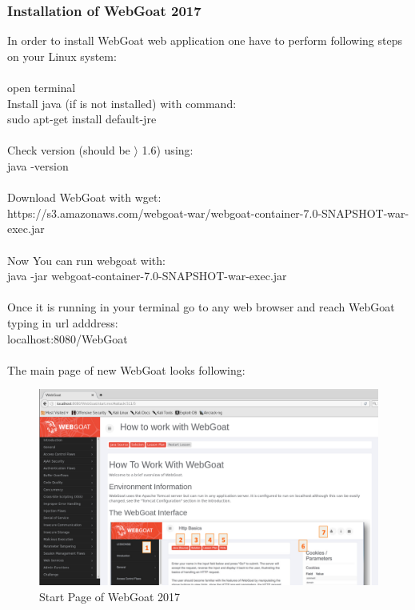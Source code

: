\documentclass[12pt, a4paper]{article}
\begin{document}
\subsubsection{Installation of WebGoat 2017}
In order to install WebGoat web application one have to perform following steps on your Linux system:\\
\\
open terminal\\
Install java (if is not installed) with command:\\
sudo apt-get install default-jre\\
\\
Check version (should be $\rangle$ 1.6) using: \\
java -version\\
\\
Download WebGoat with wget:\\
https://s3.amazonaws.com/webgoat-war/webgoat-container-7.0-SNAPSHOT-war-exec.jar\\
\\
Now You can run webgoat with:\\
java -jar webgoat-container-7.0-SNAPSHOT-war-exec.jar\\
\\
Once it is running in your terminal go to any web browser and reach WebGoat typing in url adddress:\\
localhost:8080/WebGoat\\
\\
The main page of new WebGoat looks following:\\
\begin{figure}[H]
	\includegraphics[width=1.0\textwidth]{webGoatStartPage.png}
	\caption{Start Page of WebGoat 2017}
\end{figure}
\end{document}

